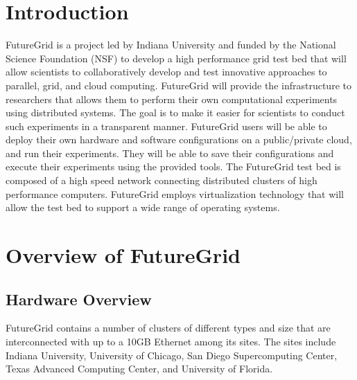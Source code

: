 \documentclass[graybox]{svmult}
\begin{document}
\abstract*{\ABSTRACT}

\abstract{\ABSTRACT}






\section{Introduction}

FutureGrid \cite{las2010gce,las12fg-bookchapter} is a project led by Indiana University and funded by the National Science Foundation (NSF) to develop a high performance grid test bed that will allow scientists to collaboratively develop and test innovative approaches to parallel, grid, and cloud computing. FutureGrid will provide the infrastructure to researchers that allows them to perform their own computational experiments using distributed systems. The goal is to make it easier for scientists to conduct such experiments in a transparent manner.  FutureGrid users will be able to deploy their own hardware and software configurations on a public/private cloud, and run their experiments. They will be able to save their configurations and execute their experiments using the provided tools. The FutureGrid test bed is composed of a high speed network connecting distributed clusters of high performance computers. FutureGrid employs virtualization technology that will allow the test bed to support a wide range of operating systems.






\section{Overview of FutureGrid}\label{S:overview}


\subsection{Hardware Overview}

FutureGrid contains a number of clusters of different types and size that are interconnected with up to a 10GB Ethernet among its sites. The sites include Indiana University, University of Chicago, San Diego Supercomputing Center, Texas Advanced Computing Center, and University of Florida.
\end{document}
